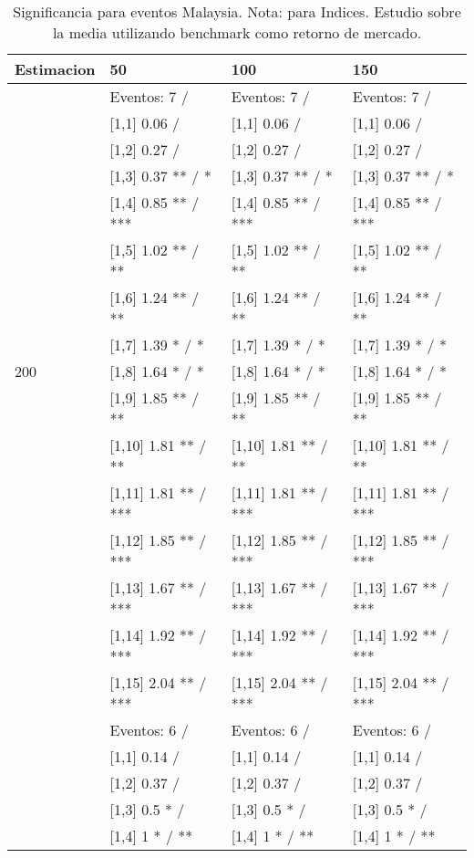 \begin{table}

\caption{Significancia para eventos Malaysia. Nota: para Indices. Estudio sobre la media utilizando benchmark como retorno de mercado.}
\centering
\begin{tabular}[t]{llll}
\toprule
Estimacion & 50 & 100 & 150\\
\midrule
 & Eventos:  7 / & Eventos:  7 / & Eventos:  7 /\\
 & {}[1,1] 0.06  / & {}[1,1] 0.06  / & {}[1,1] 0.06  /\\
 & {}[1,2] 0.27  / & {}[1,2] 0.27  / & {}[1,2] 0.27  /\\
 & {}[1,3] 0.37 ** / * & {}[1,3] 0.37 ** / * & {}[1,3] 0.37 ** / *\\
 & {}[1,4] 0.85 ** / *** & {}[1,4] 0.85 ** / *** & {}[1,4] 0.85 ** / ***\\
\addlinespace
 & {}[1,5] 1.02 ** / ** & {}[1,5] 1.02 ** / ** & {}[1,5] 1.02 ** / **\\
 & {}[1,6] 1.24 ** / ** & {}[1,6] 1.24 ** / ** & {}[1,6] 1.24 ** / **\\
 & {}[1,7] 1.39 * / * & {}[1,7] 1.39 * / * & {}[1,7] 1.39 * / *\\
200 & {}[1,8] 1.64 * / * & {}[1,8] 1.64 * / * & {}[1,8] 1.64 * / *\\
 & {}[1,9] 1.85 ** / ** & {}[1,9] 1.85 ** / ** & {}[1,9] 1.85 ** / **\\
\addlinespace
 & {}[1,10] 1.81 ** / ** & {}[1,10] 1.81 ** / ** & {}[1,10] 1.81 ** / **\\
 & {}[1,11] 1.81 ** / *** & {}[1,11] 1.81 ** / *** & {}[1,11] 1.81 ** / ***\\
 & {}[1,12] 1.85 ** / *** & {}[1,12] 1.85 ** / *** & {}[1,12] 1.85 ** / ***\\
 & {}[1,13] 1.67 ** / *** & {}[1,13] 1.67 ** / *** & {}[1,13] 1.67 ** / ***\\
 & {}[1,14] 1.92 ** / *** & {}[1,14] 1.92 ** / *** & {}[1,14] 1.92 ** / ***\\
\addlinespace
 & {}[1,15] 2.04 ** / *** & {}[1,15] 2.04 ** / *** & {}[1,15] 2.04 ** / ***\\
 & Eventos:  6 / & Eventos:  6 / & Eventos:  6 /\\
 & {}[1,1] 0.14  / & {}[1,1] 0.14  / & {}[1,1] 0.14  /\\
 & {}[1,2] 0.37  / & {}[1,2] 0.37  / & {}[1,2] 0.37  /\\
 & {}[1,3] 0.5 * / & {}[1,3] 0.5 * / & {}[1,3] 0.5 * /\\
\addlinespace
 & {}[1,4] 1 * / ** & {}[1,4] 1 * / ** & {}[1,4] 1 * / **\\

\end{tabular}
\end{table}
